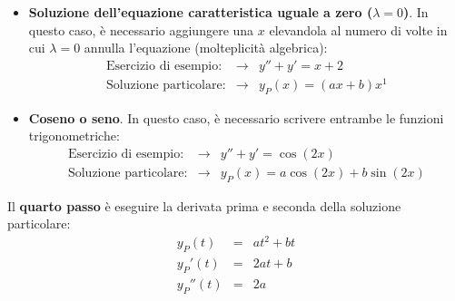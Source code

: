 \documentclass[a4paper]{article}
\begin{document}
\begin{mdframed}
\begin{itemize}
			\item \textbf{Soluzione dell'equazione caratteristica uguale a zero ($\lambda = 0$)}. In questo caso, è necessario aggiungere una $x$ elevandola al numero di volte in cui $\lambda = 0$ annulla l'equazione (molteplicità algebrica):
			\begin{equation*}
				\begin{array}{rcl}
					\text{Esercizio di esempio:} &\longrightarrow& y''+y' = x+2 \\ [1em]
					\text{Soluzione particolare:} &\longrightarrow& y_{P}\left(x\right) = \left(ax+b\right) x^{1}
				\end{array}
			\end{equation*}

			\item \textbf{Coseno o seno}. In questo caso, è necessario scrivere entrambe le funzioni trigonometriche:
			\begin{equation*}
				\begin{array}{rcl}
					\text{Esercizio di esempio:} &\longrightarrow& y''+y' = \cos\left(2x\right) \\ [1em]
					\text{Soluzione particolare:} &\longrightarrow& y_{P}\left(x\right) = a \cos\left(2x\right) + b \sin\left(2x\right)
				\end{array}
			\end{equation*}
		\end{itemize}
	\end{mdframed}

	\noindent
	Il \textbf{quarto passo} è eseguire la derivata prima e seconda della soluzione particolare:
	\begin{equation*}
		\begin{array}{rcl}
			y_{P}\left(t\right) &=& at^{2} + bt \\
			y_{P}'\left(t\right) &=& 2at + b\\
			y_{P}''\left(t\right) &=& 2a
		\end{array}
	\end{equation*}\newpage
\end{document}

